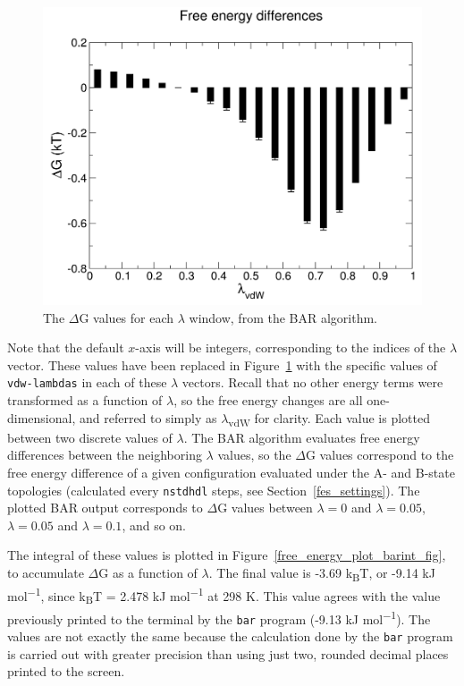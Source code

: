 \documentclass[9pt,tutorial,pubversion]{livecoms}
\begin{document}
\begin{figure}[h!]
\centering
\includegraphics{free_energy_plot_bar}
\caption{The $\Delta$G values for each $\lambda$ window, from the BAR algorithm.}
\label{free_energy_plot_bar_fig}
\end{figure}

Note that the default $x$-axis will be integers, corresponding to the indices of the $\lambda$ vector. These values have been replaced in Figure~\ref{free_energy_plot_bar_fig} with the specific values of \texttt{vdw-lambdas} in each of these $\lambda$ vectors. Recall that no other energy terms were transformed as a function of $\lambda$, so the free energy changes are all one-dimensional, and referred to simply as $\lambda$\textsubscript{vdW} for clarity. Each value is plotted between two discrete values of $\lambda$. The BAR algorithm evaluates free energy differences between the neighboring $\lambda$ values, so the $\Delta$G values correspond to the free energy difference of a given configuration evaluated under the A- and B-state topologies (calculated every \texttt{nstdhdl} steps, see Section~\ref{fes_settings}). The plotted BAR output corresponds to $\Delta$G values between $\lambda = 0$ and $\lambda = 0.05$, $\lambda = 0.05$ and $\lambda = 0.1$, and so on.

The integral of these values is plotted in Figure~\ref{free_energy_plot_barint_fig}, to accumulate $\Delta$G as a function of $\lambda$. The final value is -3.69 k\textsubscript{B}T, or -9.14 kJ mol\textsuperscript{$-$1}, since k\textsubscript{B}T = 2.478 kJ mol\textsuperscript{$-$1} at 298 K. This value agrees with the value previously printed to the terminal by the \texttt{bar} program (-9.13 kJ mol\textsuperscript{$-$1}). The values are not exactly the same because the calculation done by the \texttt{bar} program is carried out with greater precision than using just two, rounded decimal places printed to the screen.
\end{document}

